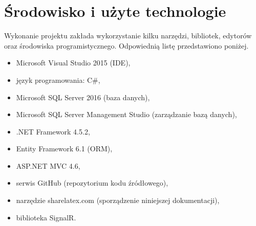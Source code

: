 \section{Środowisko i użyte technologie}
Wykonanie projektu zakłada wykorzystanie kilku narzędzi, bibliotek, edytorów oraz środowiska programistycznego. Odpowiednią listę przedstawiono poniżej.

\begin{itemize}
    \item Microsoft Visual Studio 2015 (IDE),
    \item język programowania: C\#,
    \item Microsoft SQL Server 2016 (baza danych),
    \item Microsoft SQL Server Management Studio (zarządzanie bazą danych),
    \item .NET Framework 4.5.2,
    \item Entity Framework 6.1 (ORM),
    \item ASP.NET MVC 4.6,
    \item serwis GitHub (repozytorium kodu źródłowego),
    \item narzędzie sharelatex.com (sporządzenie niniejszej dokumentacji),
    \item biblioteka SignalR.
\end{itemize}
